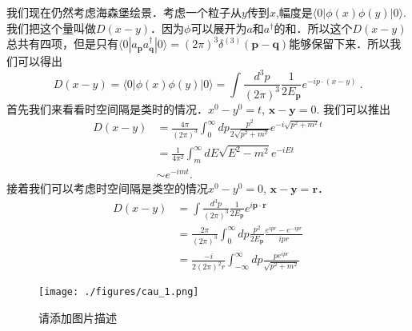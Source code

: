 
我们现在仍然考虑海森堡绘景．考虑一个粒子从$y$传到$x$,幅度是$\langle 0 |\phi(x)\phi(y)| 0 \rangle$.我们把这个量叫做$D(x-y)$．因为$\phi$可以展开为$a$和$a^\dagger$的和．所以这个$D(x-y)$总共有四项，但是只有$\langle 0 | a_{\mathbf p} a^\dagger_{\mathbf q} | 0 \rangle = (2\pi)^3 \delta^{(3)}(\mathbf p - \mathbf q)$能够保留下来．所以我们可以得出
\begin{equation}
D(x-y)=\langle 0|\phi(x) \phi(y)| 0\rangle=\int \frac{d^{3} p}{(2 \pi)^{3}} \frac{1}{2 E_{\mathbf{p}}} e^{-i p \cdot(x-y)}~.
\end{equation}
首先我们来看看时空间隔是类时的情况．$x^0 - y^0 = t$, $\mathbf x - \mathbf y = 0$. 我们可以推出
\begin{equation}
\begin{aligned}
D(x-y) &=\frac{4 \pi}{(2 \pi)^{3}} \int_{0}^{\infty} d p \frac{p^{2}}{2 \sqrt{p^{2}+m^{2}}} e^{-i \sqrt{p^{2}+m^{2}} t} \\
&=\frac{1}{4 \pi^{2}} \int_{m}^{\infty} d E \sqrt{E^{2}-m^{2}} e^{-i E t} \\
& \sim e^{-i m t} .
\end{aligned}
\end{equation}
接着我们可以考虑时空间隔是类空的情况$x^0 - y^0 = 0$, $\mathbf x - \mathbf y = \mathbf r$．
\begin{equation}
\begin{aligned}
D(x-y) &=\int \frac{d^{3} p}{(2 \pi)^{3}} \frac{1}{2 E_{\mathbf{p}}} e^{i \mathbf{p} \cdot \mathbf{r}} \\
&=\frac{2 \pi}{(2 \pi)^{3}} \int_{0}^{\infty} d p \frac{p^{2}}{2 E_{\mathbf{p}}} \frac{e^{i p r}-e^{-i p r}}{i p r} \\
&=\frac{-i}{2(2 \pi)^{2} r} \int_{-\infty}^{\infty} d p \frac{p e^{i p r}}{\sqrt{p^{2}+m^{2}}}
\end{aligned}
\end{equation}
\begin{figure}[ht]
\centering
\texttt{[image: ./figures/cau\_1.png]}
\caption{请添加图片描述} \label{cau_fig1}
\end{figure}



